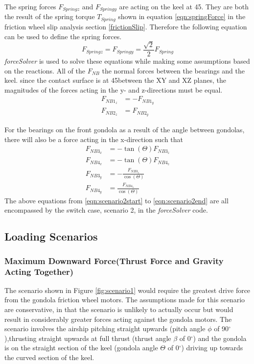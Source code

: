 \documentclass[../main.tex]{subfiles}
\begin{document}
The spring forces $F_{Springz}$ and $F_{Springy}$ are acting on the keel at 45\textdegree. They are both the result of the spring torque $T_{Spring}$ shown in equation \ref{eqn:springForce} in the friction wheel slip analysis section \ref{frictionSlip}. Therefore the following equation can be used to define the spring forces. 
\begin{equation}
F_{Springz} = F_{Springy} = \frac{\sqrt{2}}{2} F_{Spring}
\end{equation}
\textit{forceSolver} is used to solve these equations while making some assumptions based on the reactions. All of the $F_{NB}$ the normal forces between the bearings and the keel. since the contact surface is at 45\textdegree between the XY and XZ planes, the magnitudes of the forces acting in the y- and z-directions must be equal. 
\begin{align}
\label{eqn:scenario2start}
F_{NB1_{z}} &= - F_{NB1_{y}} \\
F_{NB2_{z}} &= F_{NB2_{y}} 
\end{align}

For the bearings on the front gondola as a result of the angle between gondolas, there will also be a force acting in the x-direction such that 
\begin{align}
F_{NB3_{x}} &= -\tan(\Theta) F_{NB3_{z}}\\ 
F_{NB4_{x}} &= -\tan(\Theta) F_{NB4_{z}}\\
F_{NB3_{y}} &= -\frac{F_{NB3_{z}}}{\cos(\Theta)} \\ F_{NB4_{y}} &= \frac{F_{NB4_{z}}}{\cos(\Theta)} \label{eqn:scenario2end}
\end{align}
The above equations from \ref{eqn:scenario2start} to \ref{eqn:scenario2end} are all encompassed by the switch case, scenario 2, in the \textit{forceSolver} code. 


\subsection{Loading Scenarios} \label{loadingScenarios}
\subsubsection*{Maximum Downward Force(Thrust Force and Gravity Acting Together)}
The scenario shown in Figure \ref{fig:scenario1} would require the greatest drive force from the gondola friction wheel motors. The assumptions made for this scenario are conservative, in that the scenario is unlikely to actually occur but would result in considerably greater forces acting against the gondola motors. The scenario involves the airship pitching straight upwards (pitch angle $\phi$ of 90$^{\circ}$),thrusting straight upwards at full thrust (thrust angle $\beta$ of 0$^{\circ}$) and the gondola is on the straight section of the keel (gondola angle $\Theta$ of 0$^{\circ}$) driving up towards the curved section of the keel.
\end{document}
